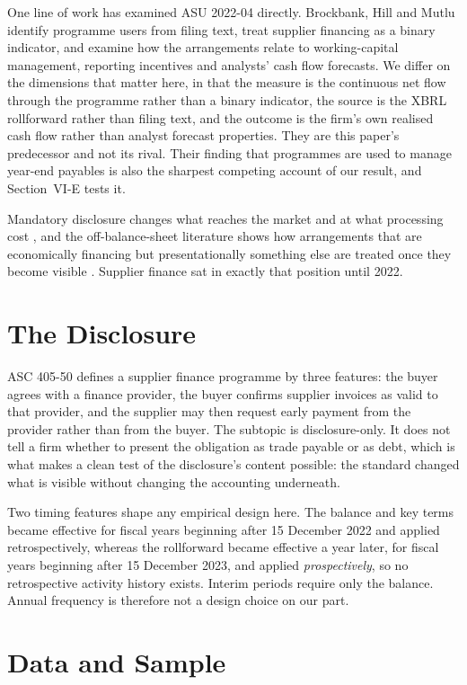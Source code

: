 \documentclass[conference,a4paper]{IEEEtran}
\begin{document}
One line of work has examined ASU 2022-04 directly. Brockbank, Hill and Mutlu
\cite{brockbank2025} identify programme users from filing text, treat supplier
financing as a binary indicator, and examine how the arrangements relate to
working-capital management, reporting incentives and analysts' cash flow
forecasts. We differ on the dimensions that matter here, in that the measure is
the continuous net flow through the programme rather than a binary indicator,
the source is the XBRL rollforward rather than filing text, and the outcome is
the firm's own realised cash flow rather than analyst forecast properties. They
are this paper's predecessor and not its rival. Their finding that programmes
are used to manage year-end payables is also the sharpest competing account of
our result, and Section~VI-E tests it.

Mandatory disclosure changes what reaches the market and at what processing cost
\cite{leuz2016, blankespoor2020, christensen2013}, and the off-balance-sheet
literature shows how arrangements that are economically financing but
presentationally something else are treated once they become visible
\cite{altamuro2014}. Supplier finance sat in exactly that position until 2022.

\section{The Disclosure}

ASC 405-50 defines a supplier finance programme by three features: the buyer
agrees with a finance provider, the buyer confirms supplier invoices as valid to
that provider, and the supplier may then request early payment from the provider
rather than from the buyer. The subtopic is disclosure-only. It does not tell a
firm whether to present the obligation as trade payable or as debt, which is
what makes a clean test of the disclosure's content possible: the standard
changed what is visible without changing the accounting underneath.

Two timing features shape any empirical design here. The balance and key terms
became effective for fiscal years beginning after 15 December 2022 and applied
retrospectively, whereas the rollforward became effective a year later, for
fiscal years beginning after 15 December 2023, and applied
\emph{prospectively}, so no retrospective activity history exists. Interim
periods require only the balance. Annual frequency is therefore not a design
choice on our part.

\section{Data and Sample}
\end{document}
